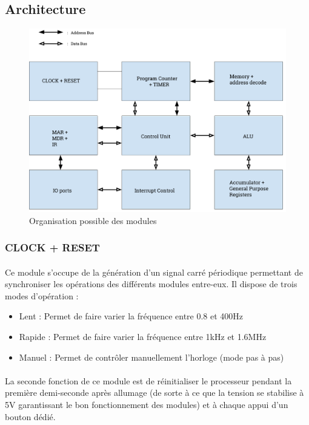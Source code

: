 \documentclass{article}
\begin{document}
    \subsection{Architecture}
    \begin{figure}[ht!]
        \label{fig_architecture}
        \centering
        \includegraphics[width=\textwidth]{figures/Architecture.png}
        \caption{Organisation possible des modules}
    \end{figure}

    \subsubsection{CLOCK + RESET}
    \paragraph{}
    Ce module s'occupe de la génération d'un signal carré périodique permettant de synchroniser les 
    opérations des différents modules entre-eux. 
    Il dispose de trois modes d'opération : \\
    \begin{itemize}
        \item Lent : Permet de faire varier la fréquence entre 0.8 et 400Hz            
        \item Rapide : Permet de faire varier la fréquence entre 1kHz et 1.6MHz            
        \item Manuel : Permet de contrôler manuellement l'horloge (mode pas à pas)            
    \end{itemize}
    
    \paragraph{}
    La seconde fonction de ce module est de réinitialiser le processeur pendant la première demi-seconde
    après allumage (de sorte à ce que la tension se stabilise à 5V garantissant le bon fonctionnement des modules)
    et à chaque appui d'un bouton dédié.
\end{document}
